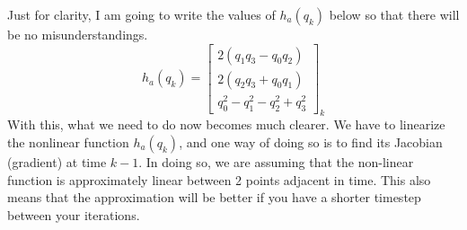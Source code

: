 \documentclass[a4paper,12pt]{book}
\begin{document}
Just for clarity, I am going to write the values of $h_a(q_k)$ below so that there will be no misunderstandings.
\begin{equation}
    h_a(q_k) = \begin{bmatrix} 2(q_1q_3 - q_0q_2) \\ 2(q_2q_3 + q_0q_1) \\ q_0^2 - q_1^2 - q_2^2 + q_3^2 \end{bmatrix}_k
\end{equation}
With this, what we need to do now becomes much clearer. We have to linearize the nonlinear function $h_a(q_k)$, and one way of doing so is to find its Jacobian (gradient) at time $k-1$. In doing so, we are assuming that the non-linear function is approximately linear between 2 points adjacent in time. This also means that the approximation will be better if you have a shorter timestep between your iterations.
\end{document}
